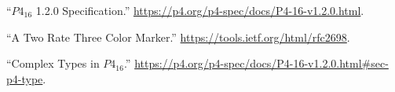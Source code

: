 \documentclass[11pt]{article}
\begin{document}
{%
{%
\begin{thebibliography}{37}%
\label{sec-bibliography}%

\mdbibitemlabel{{}[1]}\textquotedblleft{}$P4_{16}$ 1.2.0 Specification.\textquotedblright{} \href{https://p4.org/p4-spec/docs/P4-16-v1.2.0.html}{{\ttfamily https://\hspace{0pt}p4.\hspace{0pt}org/\hspace{0pt}p4-\hspace{0pt}spec/\hspace{0pt}docs/\hspace{0pt}P4-\hspace{0pt}16-\hspace{0pt}v1.\hspace{0pt}2.\hspace{0pt}0.\hspace{0pt}html}}.\label{p4spec}%

\mdbibitemlabel{{}[2]}\textquotedblleft{}A Two Rate Three Color Marker.\textquotedblright{} \href{https://tools.ietf.org/html/rfc2698}{{\ttfamily https://\hspace{0pt}tools.\hspace{0pt}ietf.\hspace{0pt}org/\hspace{0pt}html/\hspace{0pt}rfc2698}}.\label{rfc2698}%

\mdbibitemlabel{{}[3]}\textquotedblleft{}Complex Types in $P4_{16}$.\textquotedblright{} \href{https://p4.org/p4-spec/docs/P4-16-v1.2.0.html\%23sec-p4-type}{{\ttfamily https://\hspace{0pt}p4.\hspace{0pt}org/\hspace{0pt}p4-\hspace{0pt}spec/\hspace{0pt}docs/\hspace{0pt}P4-\hspace{0pt}16-\hspace{0pt}v1.\hspace{0pt}2.\hspace{0pt}0.\hspace{0pt}html\#\hspace{0pt}sec-\hspace{0pt}p4-\hspace{0pt}type}}.\label{p4complextypes}%


\end{thebibliography}}}
\end{document}
